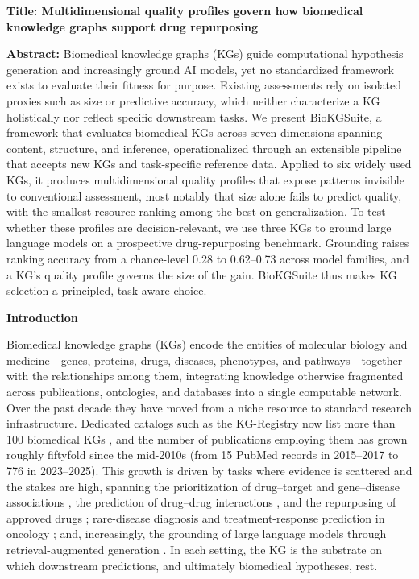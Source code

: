 \textbf{Title: Multidimensional quality profiles govern how biomedical knowledge graphs support drug repurposing}

\textbf{Abstract:} Biomedical knowledge graphs (KGs) guide computational hypothesis generation and increasingly ground AI models, yet no standardized framework exists to evaluate their fitness for purpose. Existing assessments rely on isolated proxies such as size or predictive accuracy, which neither characterize a KG holistically nor reflect specific downstream tasks. We present BioKGSuite, a framework that evaluates biomedical KGs across seven dimensions spanning content, structure, and inference, operationalized through an extensible pipeline that accepts new KGs and task-specific reference data. Applied to six widely used KGs, it produces multidimensional quality profiles that expose patterns invisible to conventional assessment, most notably that size alone fails to predict quality, with the smallest resource ranking among the best on generalization. To test whether these profiles are decision-relevant, we use three KGs to ground large language models on a prospective drug-repurposing benchmark. Grounding raises ranking accuracy from a chance-level 0.28 to 0.62--0.73 across model families, and a KG's quality profile governs the size of the gain. BioKGSuite thus makes KG selection a principled, task-aware choice.

\textbf{Introduction}

Biomedical knowledge graphs (KGs) encode the entities of molecular biology and medicine---genes, proteins, drugs, diseases, phenotypes, and pathways---together with the relationships among them, integrating knowledge otherwise fragmented across publications, ontologies, and databases into a single computable network. Over the past decade they have moved from a niche resource to standard research infrastructure. Dedicated catalogs such as the KG-Registry now list more than 100 biomedical KGs \cite{kgregistry}, and the number of publications employing them has grown roughly fiftyfold since the mid-2010s (from 15 PubMed records in 2015--2017 to 776 in 2023--2025). This growth is driven by tasks where evidence is scattered and the stakes are high, spanning the prioritization of drug--target and gene--disease associations \cite{buniello2025}, the prediction of drug--drug interactions \cite{yu2021}, and the repurposing of approved drugs \cite{himmelstein2017,bang2023}; rare-disease diagnosis \cite{fei2026} and treatment-response prediction in oncology \cite{zhao2023}; and, increasingly, the grounding of large language models through retrieval-augmented generation \cite{soman2024}. In each setting, the KG is the substrate on which downstream predictions, and ultimately biomedical hypotheses, rest.

